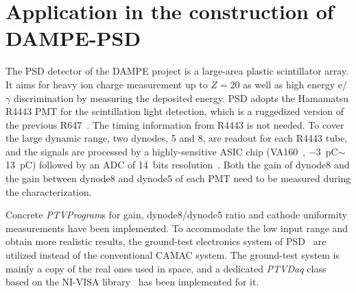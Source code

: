 \documentclass{nst}
\begin{document}
\section{Application in the construction of DAMPE-PSD}
\label{sec:application}

The PSD detector of the DAMPE project is a large-area plastic scintillator array. It aims for heavy ion charge measurement up to $Z=20$ as well as high energy e/$\gamma$ discrimination by measuring the deposited energy. PSD adopts the Hamamatsu R4443 PMT for the scintillation light detection, which is a ruggedized version of the previous R647~\cite{r4443}. The timing information from R4443 is not needed. To cover the large dynamic range, two dynodes, 5 and 8, are readout for each R4443 tube, 
and the signals are processed by a highly-sensitive ASIC chip (VA160~\cite{va160}, \SI{-3}{\pico\coulomb}$\sim$\SI{13}{\pico\coulomb}) followed by an ADC of 14~bits resolution~\cite{yanghaibo_fee}. 
Both the gain of dynode8 and the gain between dynode8 and dynode5 of each PMT need to be  measured during the characterization.

Concrete \textit{PTVProgram}s for gain, dynode8/dynode5 ratio and cathode uniformity measurements have been implemented.
To accommodate the low input range and obtain more realistic results, the ground-test electronics system of PSD~\cite{yanghaibo_fee} are utilized instead of the conventional CAMAC system. 
The ground-test system is mainly a copy of the real ones used in space, and a dedicated \textit{PTVDaq} class based on the NI-VISA library~\cite{ni_visa} has been implemented for it.

\end{document}
